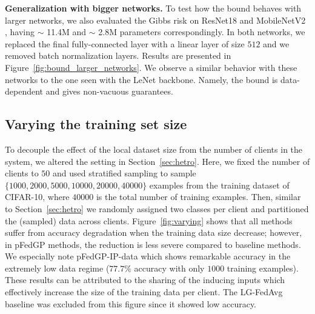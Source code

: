 \documentclass{article}
\def\Figref#1{Figure~\ref{#1}}
\def\Secref#1{Section~\ref{#1}}
\begin{document}
\textbf{Generalization with bigger networks.} To test how the bound behaves with larger networks, we also evaluated the Gibbs risk on ResNet18 \cite{he2016deep} and MobileNetV2 \cite{sandler2018mobilenetv2}, having $\sim$ 11.4M and $\sim$ 2.8M parameters correspondingly. In both networks, we replaced the final fully-connected layer with a linear layer of size $512$ and we removed batch normalization layers. Results are presented in \Figref{fig:bound_larger_networks}. We observe a similar behavior with these networks to the one seen with the LeNet backbone. Namely, the bound is data-dependent and gives non-vacuous guarantees.

\subsection{Varying the training set size} \label{sec:varying_training_size}



To decouple the effect of the local dataset size from the number of clients in the system, we altered the setting in \Secref{sec:hetro}. Here, we fixed the number of clients to $50$ and used stratified sampling to sample $\{1000, 2000, 5000, 10000, 20000, 40000\}$ examples from the training dataset of CIFAR-10, where $40000$ is the total number of training examples. Then, similar to \Secref{sec:hetro} we randomly assigned two classes per client and partitioned the (sampled) data across clients. \Figref{fig:varying} shows that all methods suffer from accuracy degradation when the training data size decrease; however, in pFedGP methods, the reduction is less severe compared to baseline methods. We especially note pFedGP-IP-data which shows remarkable accuracy in the extremely low data regime ($77.7\%$ accuracy with only $1000$ training examples). These results can be attributed to the sharing of the inducing inputs which effectively increase the size of the training data per client. The LG-FedAvg baseline was excluded from this figure since it showed low accuracy.
\end{document}

